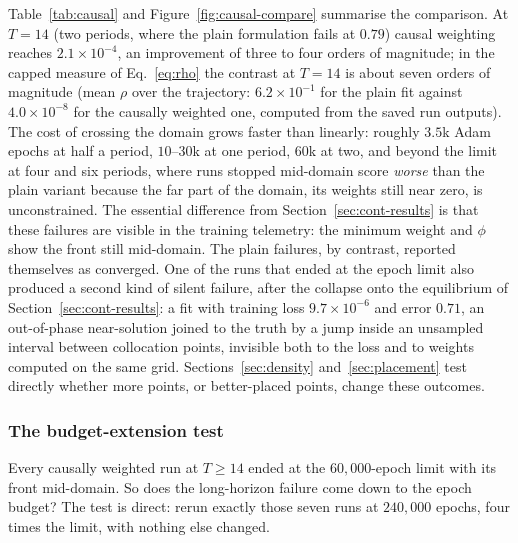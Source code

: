 \documentclass[11pt,a4paper]{article}
\begin{document}
Table~\ref{tab:causal} and Figure~\ref{fig:causal-compare} summarise the
comparison. At $T = 14$ (two periods, where the plain formulation
fails at $0.79$) causal weighting reaches $2.1\times10^{-4}$, an
improvement of three to four orders of magnitude; in the capped measure of
Eq.~\eqref{eq:rho} the contrast at $T=14$ is about seven orders of
magnitude (mean $\rho$ over the trajectory: $6.2\times10^{-1}$ for the
plain fit against $4.0\times10^{-8}$ for the causally weighted one,
computed from the saved run outputs). The cost of crossing the domain
grows faster than linearly:
roughly $3.5$k Adam epochs at half a period, $10$--$30$k at one
period, $60$k at two, and beyond the limit at four and six periods,
where runs stopped mid-domain score \emph{worse} than the plain
variant because the far part of the domain, its weights still near zero,
is unconstrained.
The essential difference from Section~\ref{sec:cont-results} is that
these failures are visible in the training telemetry: the minimum weight
and $\phi$ show the front still mid-domain. The plain failures, by
contrast, reported themselves as converged. One of the runs that ended at
the epoch limit also produced a second kind of silent failure, after the
collapse onto the equilibrium of Section~\ref{sec:cont-results}: a fit
with training loss $9.7\times10^{-6}$ and error $0.71$, an out-of-phase
near-solution joined to the truth by a jump inside an unsampled interval
between collocation points, invisible both to the loss and to weights
computed on the same grid. Sections~\ref{sec:density}
and~\ref{sec:placement} test directly whether more points, or
better-placed points, change these outcomes.

\subsubsection{The budget-extension test}

Every causally weighted run at $T \ge 14$ ended at the $60{,}000$-epoch
limit with its front mid-domain. So does the long-horizon failure come
down to the epoch budget? The test is direct: rerun exactly those seven
runs at $240{,}000$ epochs, four times the limit, with nothing else
changed.
\end{document}
